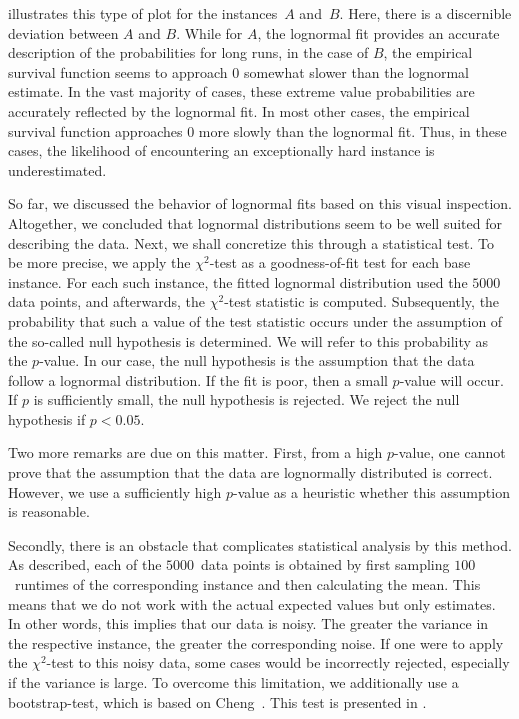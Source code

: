  illustrates this type of plot for the instances~$A$ and~$B$. Here, there is a discernible deviation between $A$ and $B$. While for $A$, the lognormal fit provides an accurate description of the probabilities for long runs, in the case of $B$, the empirical survival function seems to approach $0$ somewhat slower than the lognormal estimate. In the vast majority of cases, these extreme value probabilities are accurately reflected by the lognormal fit. In most other cases, the empirical survival function approaches 0 more slowly than the lognormal fit. Thus, in these cases, the likelihood of encountering an exceptionally hard instance is underestimated.

So far, we discussed the behavior of lognormal fits based on this visual inspection. Altogether, we concluded that lognormal distributions seem to be well suited for describing the data. Next, we shall concretize this through a statistical test. To be more precise, we apply the $\chi^2$-test as a goodness-of-fit test for each base instance.
For each such instance, the fitted lognormal distribution used the $5000$ data points, and afterwards, the $\chi^2$-test statistic is computed. Subsequently, the probability that such a value of the test statistic occurs under the assumption of the so-called null hypothesis is determined. We will refer to this probability as the $p$-value. In our case, the null hypothesis is the assumption that the data follow a lognormal distribution. If the fit is poor, then a small $p$-value will occur. If $p$ is sufficiently small, the null hypothesis is rejected. We reject the null hypothesis if \mbox{$p<0.05$}. 

Two more remarks are due on this matter. First, from a high $p$-value, one cannot 
prove
that the assumption that the data are lognormally distributed is correct.
However, we use a sufficiently high $p$-value as a heuristic whether this assumption is reasonable.

Secondly, there is an obstacle that complicates statistical analysis by this method. As described,
each of the $5000$~data points is obtained by first sampling $100$~runtimes of the corresponding instance and then calculating the mean. 
This means that we do not work with the actual expected values but only estimates. In other words, this implies that our data is noisy. The greater the variance in the respective instance, the greater the corresponding noise. If one were to apply the $\chi^2$-test to this noisy data, some cases would be incorrectly rejected, especially if the variance is large. To overcome this limitation, we additionally use a bootstrap-test, which is based on Cheng~\cite{cheng2017non}. This test is presented %
in .

